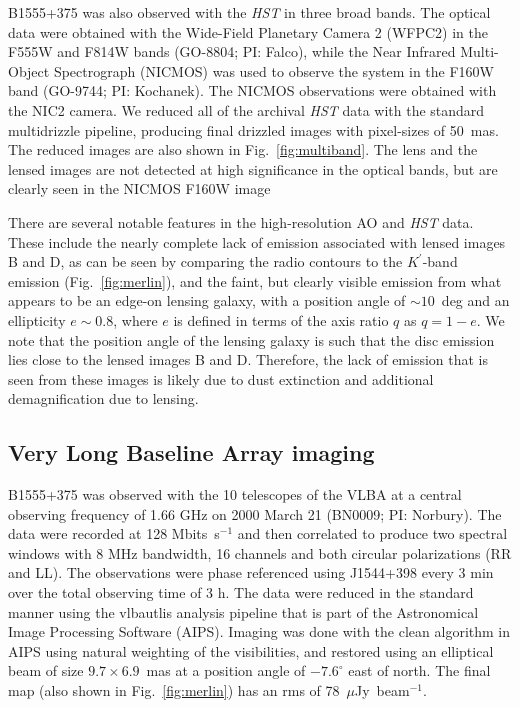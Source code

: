 \documentclass[a4paper,fleqn,usenatbib,useAMS]{mnras}
\begin{document}
B1555+375 was also observed with the {\it HST} in three broad bands.  The optical data were obtained with the Wide-Field Planetary Camera 2 (WFPC2) in the F555W and F814W bands (GO-8804; PI: Falco), while the Near Infrared Multi-Object Spectrograph (NICMOS) was used to observe the system in the F160W band (GO-9744; PI: Kochanek).  The NICMOS observations were obtained with the NIC2 camera.  We reduced all of the archival \textit{HST} data with the standard {\sc multidrizzle} pipeline, producing final drizzled images with pixel-sizes of 50~mas. The reduced images are also shown in Fig.~\ref{fig:multiband}. The lens and the lensed images are not detected at high significance in the optical bands, but are clearly seen in the NICMOS F160W image

There are several notable features in the high-resolution AO and {\it HST} data. These include the nearly complete lack of emission associated with lensed images B and D, as can be seen by comparing the radio contours to the $K^\prime$-band emission  (Fig.~\ref{fig:merlin}), and the faint, but clearly visible emission from what appears to be an edge-on lensing galaxy, with a position angle of $\sim 10$~deg and an ellipticity $e \sim 0.8$, where $e$ is defined in terms of the axis ratio $q$ as $q=1-e$.  We note that the position angle of the lensing galaxy is such that the disc emission lies close to the lensed images B and D. Therefore, the lack of emission that is seen from these images is likely due to dust extinction and additional demagnification due to lensing. 

\subsection{Very Long Baseline Array imaging}

B1555+375 was observed with the 10 telescopes of the VLBA at a central observing frequency of 1.66 GHz on 2000 March 21 (BN0009; PI: Norbury). The data were recorded at 128 Mbits~s$^{-1}$ and then correlated to produce two spectral windows with 8 MHz bandwidth, 16 channels and both circular polarizations (RR and LL). The observations were phase referenced using J1544+398 every 3 min over the total observing time of 3 h. The data were reduced in the standard manner using the {\sc vlbautlis} analysis pipeline that is part of the Astronomical Image Processing Software (AIPS). Imaging was done with the {\sc clean} algorithm in AIPS using natural weighting of the visibilities, and restored using an elliptical beam of size $9.7 \times 6.9$~mas at a position angle of $-7.6^\circ$ east of north. The final map (also shown in Fig.~\ref{fig:merlin}) has an rms of 78~$\mu$Jy~beam$^{-1}$.
\end{document}
